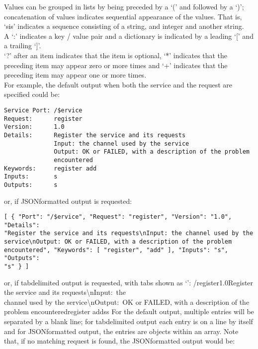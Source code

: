 Values can be grouped in lists by being preceded by a `(' and followed by a `)';
concatenation of values indicates sequential appearance of the values.
That is, `sis' indicates a sequence consisting of a string, and integer and another
string.\\

A `:' indicates a key / value pair and a dictionary is indicated by a leading `[' and a
trailing `]'.\\

`?' after an item indicates that the item is optional, `*' indicates that the preceding
item may appear zero or more times and `+' indicates that the preceding item may appear
one or more times.\\

For example, the default output when both the service and the request are specified could
be:
\outputBegin{}
\begin{verbatim}
Service Port: /$ervice
Request:      register
Version:      1.0
Details:      Register the service and its requests
              Input: the channel used by the service
              Output: OK or FAILED, with a description of the problem
              encountered
Keywords:     register add
Inputs:       s
Outputs:      s
\end{verbatim}
\outputEnd{}
or, if JSON\longDash{}formatted output is requested:
\outputBegin{}
\begin{verbatim}
[ { "Port": "/$ervice", "Request": "register", "Version": "1.0", "Details":
"Register the service and its requests\nInput: the channel used by the
service\nOutput: OK or FAILED, with a description of the problem
encountered", "Keywords": [ "register", "add" ], "Inputs": "s", "Outputs":
"s" } ]
\end{verbatim}
\outputEnd{}
or, if tab\longDash{}delimited output is requested, with tabs shown as `\tabSymbol':
\outputBegin{}
/\dollarService\pseudotab{}register\pseudotab{}1.0\pseudotab{}Register the service and its
requests\textbackslash{}nInput:\ the\\
channel used by the service\textbackslash{}nOutput:\ OK or FAILED, with a description of
the\\
problem encountered\pseudotab{}register add\pseudotab{}s\pseudotab{}s
\outputEnd{}
For the default output, multiple entries will be separated by a blank line; for
tab\longDash{}delimited output each entry is on a line by itself and for
JSON\longDash{}formatted output, the entries are objects within an array.
Note that, if no matching request is found, the JSON\longDash{}formatted output would be:
